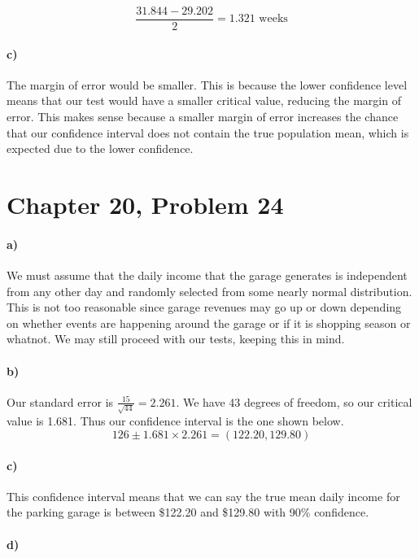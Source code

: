 \documentclass[12pt]{article}
\begin{document}
\[\frac{31.844-29.202}{2}=1.321 \text{ weeks}\]

\paragraph{c)}

The margin of error would be smaller. This is because the lower confidence level means that our test would have a smaller
critical value, reducing the margin of error. This makes sense because a smaller margin of error increases the chance
that our confidence interval does not contain the true population mean, which is expected due to the lower confidence.

\section*{Chapter 20, Problem 24}

\paragraph{a)}

We must assume that the daily income that the garage generates is independent from any other day and randomly selected
from some nearly normal distribution. This is not too reasonable since garage revenues may go up or down depending on
whether events are happening around the garage or if it is shopping season or whatnot. We may still proceed with our tests,
keeping this in mind.

\paragraph{b)}

Our standard error is \(\frac{15}{\sqrt{44}}=2.261\). We have 43 degrees of freedom, so our critical value is 1.681. Thus
our confidence interval is the one shown below.
\[126\pm1.681\times2.261=(122.20,129.80)\]

\paragraph{c)}

This confidence interval means that we can say the true mean daily income for the parking garage is between \$122.20
and \$129.80 with 90\% confidence.

\paragraph{d)}
\end{document}
